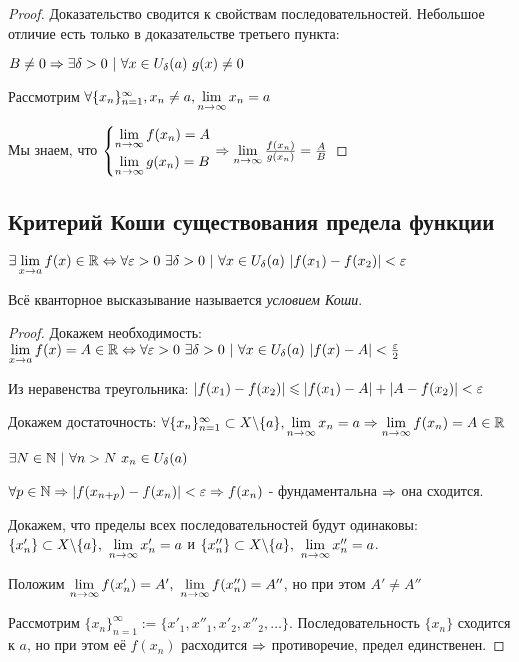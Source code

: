 \begin{proof}
	Доказательство сводится к свойствам последовательностей. Небольшое отличие есть только в доказательстве третьего пункта:
	
	$B \neq 0 \Ra \exists \delta > 0\ |\ \forall x \in U_{\delta}(a)\ g(x) \neq 0$
	
	Рассмотрим $\forall \{x_n\}_{n = 1}^\infty, x_n \neq a, \lim\limits_{n \rightarrow \infty} x_n = a$
	
	Мы знаем, что $\left\{\begin{aligned}&{\lim\limits_{n \rightarrow \infty} f(x_n) = A} \\ &{\lim\limits_{n \rightarrow \infty} g(x_n) = B}\end{aligned}\right. \Rightarrow \lim\limits_{n \rightarrow \infty} \frac{f(x_n)}{g(x_n)} = \frac{A}{B}$
\end{proof}

\subsection{Критерий Коши существования предела функции}

\begin{theorem}
	$\exists \lim\limits_{x \rightarrow a} f(x) \in \mathbb{R} \Leftrightarrow \forall \varepsilon > 0\ \exists \delta > 0\ |\ \forall x \in U_{\delta}(a)\ |f(x_1) - f(x_2)| < \varepsilon$
	
	Всё кванторное высказывание называется \textit{условием Коши}.
\end{theorem}

\begin{proof}
	Докажем необходимость: $\lim\limits_{x \rightarrow a} f(x) = A \in \mathbb{R} \Leftrightarrow \forall \varepsilon > 0\ \exists \delta > 0\ |\ \forall x \in U_{\delta}(a)\ |f(x) - A| < \frac{\varepsilon}{2}$
	
	Из неравенства треугольника: $|f(x_1) - f(x_2)| \leqslant |f(x_1) - A| + |A - f(x_2)| < \varepsilon$
	
	Докажем достаточность: $\forall \{x_n\}_{n = 1}^\infty \subset X \backslash \{a\}, \lim\limits_{n \rightarrow \infty} x_n = a \Rightarrow \lim\limits_{n \rightarrow \infty} f(x_n) = A \in \mathbb{R}$
	
	$\exists N \in \mathbb{N}\ |\ \forall n > N\ x_n \in U_{\delta}(a)$
	
	$\forall p \in \mathbb{N} \Rightarrow |f(x_{n + p}) - f(x_n)| < \varepsilon \Rightarrow f(x_n)$ - фундаментальна $\Rightarrow$ она сходится.
	
	Докажем, что пределы всех последовательностей будут одинаковы: $\{x'_n\} \subset X \backslash \{a\},\ \lim\limits_{n \rightarrow \infty} x'_n = a$ и $\{x''_n\} \subset X \backslash \{a\},\ \lim\limits_{n \rightarrow \infty} x''_n = a$.
	
	Положим $\lim\limits_{n \rightarrow \infty} f(x'_n) = A',\ \lim\limits_{n \rightarrow \infty} f(x''_n) = A''$, но при этом $A' \neq A''$
	
	Рассмотрим $\{x_n\}_{n = 1}^\infty := \{x'_1, x''_1, x'_2, x''_2, \dots\}$. Последовательность $\{x_n\}$ сходится к $a$, но при этом её $f(x_n)$ расходится $\Rightarrow$ противоречие, предел единственен.
\end{proof}